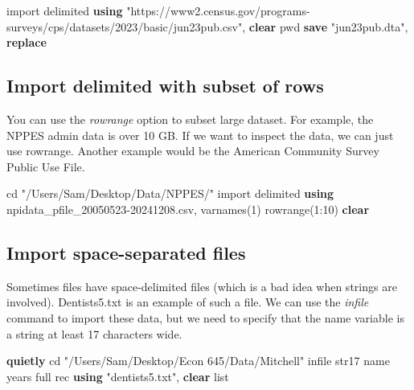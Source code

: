 \documentclass[
]{book}
\newenvironment{Shaded}{\begin{snugshade}}{\end{snugshade}}
\newcommand{\BaseNTok}[1]{\textcolor[rgb]{0.00,0.00,0.81}{#1}}
\newcommand{\KeywordTok}[1]{\textcolor[rgb]{0.13,0.29,0.53}{\textbf{#1}}}
\newcommand{\NormalTok}[1]{#1}
\newcommand{\OtherTok}[1]{\textcolor[rgb]{0.56,0.35,0.01}{#1}}
\newcommand{\StringTok}[1]{\textcolor[rgb]{0.31,0.60,0.02}{#1}}
\begin{document}
\begin{Shaded}
\begin{Highlighting}[]
\NormalTok{import delimited }\KeywordTok{using} \StringTok{"https://www2.census.gov/programs{-}surveys/cps/datasets/2023/basic/jun23pub.csv"}\NormalTok{, }\KeywordTok{clear}
\NormalTok{pwd}
\KeywordTok{save} \StringTok{"jun23pub.dta"}\NormalTok{, }\KeywordTok{replace}
\end{Highlighting}
\end{Shaded}

\subsection{Import delimited with subset of rows}\label{import-delimited-with-subset-of-rows}

You can use the \emph{rowrange} option to subset large dataset. For example, the NPPES admin data is over 10 GB. If we want to inspect the data, we can just use rowrange. Another example would be the American Community Survey Public Use File.

\begin{Shaded}
\begin{Highlighting}[]
\NormalTok{cd }\StringTok{"/Users/Sam/Desktop/Data/NPPES/"}
\NormalTok{import delimited }\KeywordTok{using}\NormalTok{ npidata\_pfile\_20050523{-}20241208.csv, varnames(1) rowrange(1:10) }\KeywordTok{clear}
\end{Highlighting}
\end{Shaded}

\subsection{Import space-separated files}\label{import-space-separated-files}

Sometimes files have space-delimited files (which is a bad idea when strings are involved). Dentists5.txt is an example of such a file. We can use the \emph{infile} command to import these data, but we need to specify that the name variable is a string at least 17 characters wide.

\begin{Shaded}
\begin{Highlighting}[]
\KeywordTok{quietly}\NormalTok{ cd }\StringTok{"/Users/Sam/Desktop/Econ 645/Data/Mitchell"}
\NormalTok{infile str17 }\BaseNTok{name}\NormalTok{ years full rec }\KeywordTok{using} \StringTok{"dentists5.txt"}\NormalTok{, }\KeywordTok{clear}
\OtherTok{list}
\end{Highlighting}
\end{Shaded}
\end{document}
